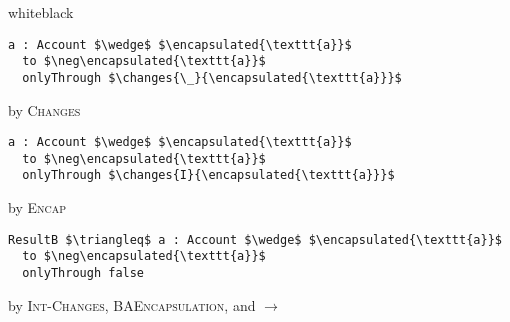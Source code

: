 \begin{minipage}{\linewidth}
\begin{proofBox}{white}{black}
\footnotesize
\begin{minipage}{0.75\textwidth}
\begin{lstlisting}[language = Chainmail, mathescape=true, frame=single]
a : Account $\wedge$ $\encapsulated{\texttt{a}}$ 
  to $\neg\encapsulated{\texttt{a}}$
  onlyThrough $\changes{\_}{\encapsulated{\texttt{a}}}$
\end{lstlisting}
\end{minipage}
\begin{minipage}{0.24\textwidth}
\scriptsize
\hfill by \textsc{Changes}
\end{minipage}
\begin{minipage}{0.75\textwidth}
\begin{lstlisting}[language = Chainmail, mathescape=true]
a : Account $\wedge$ $\encapsulated{\texttt{a}}$ 
  to $\neg\encapsulated{\texttt{a}}$
  onlyThrough $\changes{I}{\encapsulated{\texttt{a}}}$
\end{lstlisting}
\end{minipage}
\begin{minipage}{0.24\textwidth}
\scriptsize
\hfill by \textsc{Encap}
\end{minipage}
\begin{minipage}{0.75\textwidth}
\begin{lstlisting}[language = Chainmail, mathescape=true, frame=none]
ResultB $\triangleq$ a : Account $\wedge$ $\encapsulated{\texttt{a}}$ 
  to $\neg\encapsulated{\texttt{a}}$ 
  onlyThrough false
\end{lstlisting}
\end{minipage}
\begin{minipage}{0.24\textwidth}
\scriptsize
\hfill by \textsc{Int-Changes}, \textsc{BAEncapsulation}, and $\longrightarrow$
\end{minipage}
\end{proofBox}


\end{minipage}
